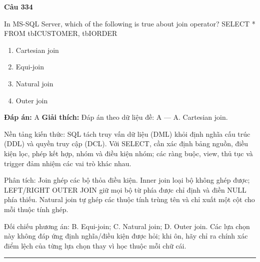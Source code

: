 \documentclass[11pt,a4paper]{article}
\newenvironment{question}[1]{%
  \par\vspace{1em}\noindent\textbf{\large Câu #1}\par\vspace{0.4em}
}{%
  \par\vspace{1em}\hrule\vspace{0.6em}
}
\newenvironment{choices}{%
  \begin{enumerate}[label=\textbf{\Alph*.},leftmargin=2.2em,itemsep=2pt,topsep=3pt]
}{%
  \end{enumerate}
}
\newcommand{\choice}{\item}
\begin{document}
\begin{question}{334}
In MS-SQL Server, which of the following is true about join operator?
SELECT * FROM tbICUSTOMER, tbIORDER
\begin{choices}
\choice Cartesian join
\choice Equi-join
\choice Natural join
\choice Outer join
\end{choices}
\textbf{Đáp án:} A
\textbf{Giải thích:} Đáp án theo dữ liệu đề: A — A. Cartesian join.

Nền tảng kiến thức: SQL tách truy vấn dữ liệu (DML) khỏi định nghĩa cấu trúc (DDL) và quyền truy cập (DCL). Với SELECT, cần xác định bảng nguồn, điều kiện lọc, phép kết hợp, nhóm và điều kiện nhóm; các ràng buộc, view, thủ tục và trigger đảm nhiệm các vai trò khác nhau.

Phân tích: Join ghép các bộ thỏa điều kiện. Inner join loại bộ không ghép được; LEFT/RIGHT OUTER JOIN giữ mọi bộ từ phía được chỉ định và điền NULL phía thiếu. Natural join tự ghép các thuộc tính trùng tên và chỉ xuất một cột cho mỗi thuộc tính ghép.

Đối chiếu phương án: B. Equi-join; C. Natural join; D. Outer join. Các lựa chọn này không đáp ứng định nghĩa/điều kiện được hỏi; khi ôn, hãy chỉ ra chính xác điểm lệch của từng lựa chọn thay vì học thuộc mỗi chữ cái.
\end{question}
\end{document}
